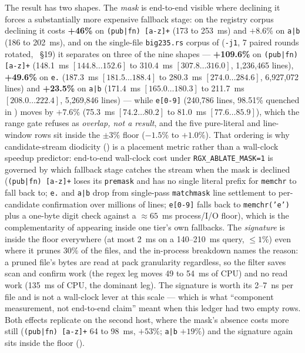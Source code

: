 \documentclass[11pt,letterpaper]{article}
\begin{document}
The result has two shapes. The \emph{mask} is end-to-end visible where
declining it forces a substantially more expensive fallback stage: on the
registry corpus declining it costs \textbf{+46\%} on
\texttt{(pub|fn) [a-z]+} (173 to 253~ms) and $+8.6\%$ on \texttt{a|b}
(186 to 202~ms), and on the single-file \texttt{big235.rs} corpus of
 (\texttt{-j1}, 7 paired rounds rotated,
~\S 19) it separates on three of the nine
shapes --- \textbf{+109.6\%} on \texttt{(pub|fn) [a-z]+} (148.1~ms
$[144.8\dots 152.6]$ to 310.4~ms $[307.8\dots 316.0]$, 1{,}236{,}465 lines),
\textbf{+49.6\%} on \texttt{e.} (187.3~ms $[181.5\dots 188.4]$ to 280.3~ms
$[274.0\dots 284.6]$, 6{,}927{,}072 lines) and \textbf{+23.5\%} on
\texttt{a|b} (171.4~ms $[165.0\dots 180.3]$ to 211.7~ms $[208.0\dots 222.4]$,
5{,}269{,}846 lines) --- while \texttt{e[0-9]} (240{,}786 lines, 98.51\%
quenched in ) moves by $+7.6\%$ (75.3~ms $[74.2\dots 80.2]$
to 81.0~ms $[77.6\dots 85.9]$), which the range gate refuses as
\emph{overlap, not a result}, and the five pure-literal and line-window rows
sit inside the $\pm 3\%$ floor ($-1.5\%$ to $+1.0\%$). That ordering is why
candidate-stream diodicity () is a placement metric rather than
a wall-clock speedup predictor: end-to-end wall-clock cost under
\texttt{RGX\_ABLATE\_MASK=1} is governed by which fallback stage catches the
stream when the mask is declined (\texttt{(pub|fn) [a-z]+} loses its
\texttt{premask} and has no single literal prefix for \texttt{memchr} to
fall back to; \texttt{e.} and \texttt{a|b} drop from single-pass
\texttt{matchmask} line settlement to per-candidate confirmation over
millions of lines; \texttt{e[0-9]} falls back to \texttt{memchr('e')} plus a
one-byte digit check against a $\approx 65$~ms process/I/O floor), which is
the complementarity of  appearing inside one tier's own
fallbacks. The \emph{signature} is inside the floor everywhere (at most
2~ms on a 140--210~ms query, $\le 1\%$) even where it prunes 30\% of the
files, and the in-process breakdown names the reason: a pruned file's
bytes are read at pack granularity regardless, so the filter saves scan
and confirm work (the regex leg moves 49 to 54~ms of CPU) and no read work
(135~ms of CPU, the dominant leg). The signature is worth its 2--7~ns per
file and is not a wall-clock lever at this scale --- which is what
``component measurement, not end-to-end claim'' meant when this ledger had
two empty rows. Both effects replicate on the second host, where the
mask's absence costs more still (\texttt{(pub|fn) [a-z]+} 64 to 98~ms,
$+53\%$; \texttt{a|b} $+19\%$) and the signature again sits inside the
floor ().
\end{document}
